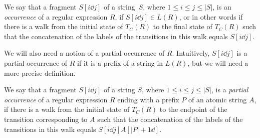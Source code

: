 \begin{definition}
We say that a fragment $S[i \dd j]$ of a string~$S$, where $1\le i\le j \le |S|$, is an \emph{occurrence} of a regular expression $R$, if $S[i \dd j] \in L(R)$, or in other words if there is a walk from the initial state of $T_C(R)$ to the final state of $T_C(R)$ such that the concatenation of the labels of the transitions in this walk equals $S[i \dd j]$.
\end{definition}

We will also need a notion of a partial occurrence of $R$. Intuitively, $S[i \dd j]$ is a partial occurrence of $R$ if it is a prefix of a string in $L(R)$, but we will need a more precise definition.

\begin{definition}\label{def:partial_occ_regexp}
We say that a fragment $S[i \dd j]$ of a string $S$, where $1\le i\le j \le |S|$, is a \emph{partial occurrence} of a regular expression $R$ ending with a prefix $P$ of an atomic string $A$, if there is a walk from the initial state of $T_C(R)$ to the endpoint of the transition corresponding to $A$ such that the concatenation of the labels of the transitions in this walk equals $S[i \dd j] A[|P|+1\dd]$. 
\end{definition}
